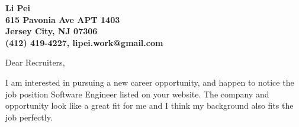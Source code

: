 \documentclass[11pt]{letter} %
\begin{document}

\begin{letter}{} 


\begin{center}
\large\bf Li Pei \\ %
615 Pavonia Ave APT 1403 \\ Jersey City, NJ 07306 \\ (412) 419-4227, lipei.work@gmail.com %
\end{center} 
\vfill

\signature{Li Pei} %


\opening{Dear Recruiters,} 
 

I am interested in pursuing a new career opportunity, and happen to notice the job position Software Engineer listed on your website. The company and opportunity look like a great fit for me and I think my background also fits the job perfectly.   



\end{letter}
\end{document}
